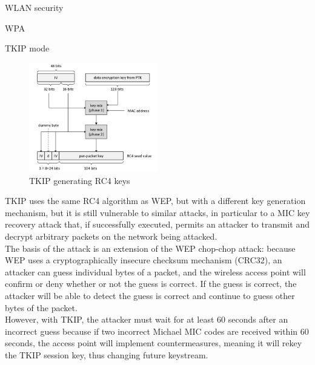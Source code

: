 \begin{section}{WLAN security}
\begin{subsection}{WPA}
\begin{subsubsection}{TKIP mode}
\begin{itemize}
      \end{itemize}
      \begin{figure}[h]
        \centering
        \includegraphics[width=0.5\textwidth]{img/wireless/TKIP key generation.png}
        \caption{TKIP generating RC4 keys}
      \end{figure}
      TKIP uses the same RC4 algorithm as WEP, but with a different key generation mechanism, but it 
      is still vulnerable to similar attacks, in particular to a MIC key recovery attack that, if 
      successfully executed, permits an attacker to transmit and decrypt arbitrary packets on the 
      network being attacked.\\
      The basis of the attack is an extension of the WEP chop-chop attack: because WEP uses a 
      cryptographically insecure checksum mechanism (CRC32), an attacker can guess individual
      bytes of a packet, and the wireless access point will confirm or deny whether or not the 
      guess is correct. If the guess is correct, the attacker will be able to detect the guess 
      is correct and continue to guess other bytes of the packet.\\
      However, with TKIP, the attacker must wait for at least 60 seconds after an incorrect guess 
      because if two incorrect Michael MIC codes are received within 60 seconds, the access point 
      will implement countermeasures, meaning it will rekey the TKIP session key, thus changing 
      future keystream.
    \end{subsubsection}
    

\end{subsection}
\end{section}
